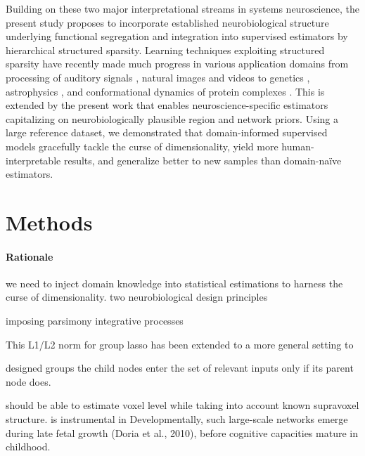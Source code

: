 \documentclass{article} %
\begin{document}
Building on these two major interpretational streams in systems neuroscience,
the present study proposes to incorporate
established neurobiological structure underlying
functional segregation and integration
into supervised estimators
by hierarchical structured sparsity.
%
Learning techniques
exploiting structured sparsity 
have recently made much progress in various application domains
from processing of auditory signals \cite{daudet2004sparse},
natural images \cite{harzallah2009combining} and
videos \cite{kang2015structured, kim2010sparse}
to
genetics \cite{rapaport2008classification, kim2012tree},
astrophysics \cite{vinci2014estimating},
and
conformational dynamics of protein complexes \cite{jenatton2009structured}.
%
This is extended by the present work that
enables neuroscience-specific estimators capitalizing on
neurobiologically plausible region and network priors.
%
Using a large reference dataset,
we demonstrated that domain-informed supervised models
gracefully tackle the curse of dimensionality,
yield more human-interpretable results,
and generalize better to new samples
than domain-na\"ive estimators.



\section{Methods}
%
\paragraph{Rationale}

we need to inject domain knowledge into
statistical estimations to harness the curse of dimensionality.
two neurobiological design principles 

imposing parsimony
integrative processes

 This L1/L2 norm for group lasso has been extended to a more general setting to

designed groups
 the child nodes enter the set of relevant inputs only if its parent node does. 
 
should be able to estimate voxel level
while taking into account known supravoxel structure.
is instrumental in
Developmentally, such large-scale networks emerge during late
fetal growth (Doria et al., 2010), before cognitive capacities mature
in childhood. 
\end{document}
